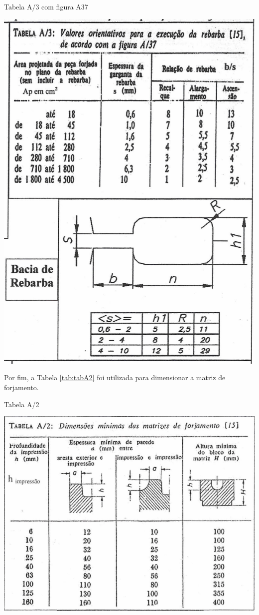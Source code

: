 \documentclass[deposito, acronym, symbols]{fei}
\begin{document}
\begin{table}[!htb]
 \centering
    \caption{Tabela A/3 com figura A37}
    \includegraphics[width=0.8\linewidth]{Imagens/Tabela A3 fig A37.png}
    \label{tab:tabA3}
\end{table}

Por fim, a Tabela \ref{tab:tabA2} foi utilizada para dimensionar a matriz de forjamento. 
\begin{table}[!htb]
 \centering
    \caption{Tabela A/2}
    \includegraphics[width=1\linewidth]{Imagens/Tabela A2.png}
    \label{tab:tabA2}
\end{table}
\end{document}
